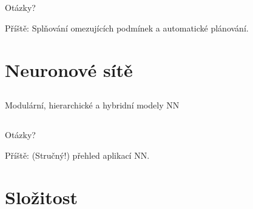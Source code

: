 \documentclass{beamer}
\begin{document}
\subsection{}
\begin{frame}{Otázky?}
\begin{center}
Příště: Splňování omezujících podmínek a automatické plánování.
\end{center}
\end{frame}

\section{Neuronové sítě}

\subsection{}
\begin{frame}{Modulární, hierarchické a hybridní modely NN}
\end{frame}

\subsection{}
\begin{frame}{Otázky?}
\begin{center}
Příště: (Stručný!) přehled aplikací NN.
\end{center}
\end{frame}

\section{Složitost}
\end{document}
